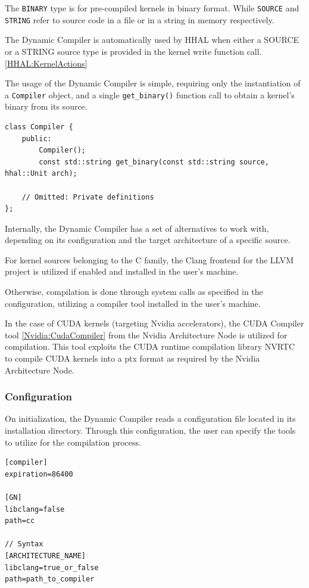 The \texttt{BINARY} type is for pre-compiled kernels in binary format. While \texttt{SOURCE} and \texttt{STRING} refer to source code in a file or in a string in memory respectively.

The Dynamic Compiler is automatically used by HHAL when either a SOURCE or a STRING source type is provided in the kernel write function call. \ref{HHAL:KernelActions}

The usage of the Dynamic Compiler is simple, requiring only the instantiation of a \texttt{Compiler} object, and a single \texttt{get\_binary()} function call to obtain a kernel's binary from its source.

\begin{lstlisting}[style=CStyle, caption=HHAL Dynamic Compiler - Compiler class]
class Compiler {
    public:
        Compiler();
        const std::string get_binary(const std::string source, hhal::Unit arch);

    // Omitted: Private definitions
};
\end{lstlisting}

Internally, the Dynamic Compiler has a set of alternatives to work with, depending on its configuration and the target architecture of a specific source.

For kernel sources belonging to the C family, the Clang frontend for the LLVM project \cite{clang_llvm} is utilized if enabled and installed in the user's machine.

Otherwise, compilation is done through system calls as specified in the configuration, utilizing a compiler tool installed in the user's machine.

In the case of CUDA kernels (targeting Nvidia accelerators), the CUDA Compiler tool \ref{Nvidia:CudaCompiler} from the Nvidia Architecture Node is utilized for compilation. This tool exploits the CUDA runtime compilation library NVRTC to compile CUDA kernels into a ptx format as required by the Nvidia Architecture Node.

\subsubsection{Configuration} \label{HHAL:DynamicCompilerConfiguration}

On initialization, the Dynamic Compiler reads a configuration file located in its installation directory. Through this configuration, the user can specify the tools to utilize for the compilation process.

\begin{lstlisting}[style=CStyle, caption=HHAL Dynamic Compiler - Configuration example]
[compiler]
expiration=86400

[GN]
libclang=false
path=cc

// Syntax
[ARCHITECTURE_NAME]
libclang=true_or_false
path=path_to_compiler
\end{lstlisting}

